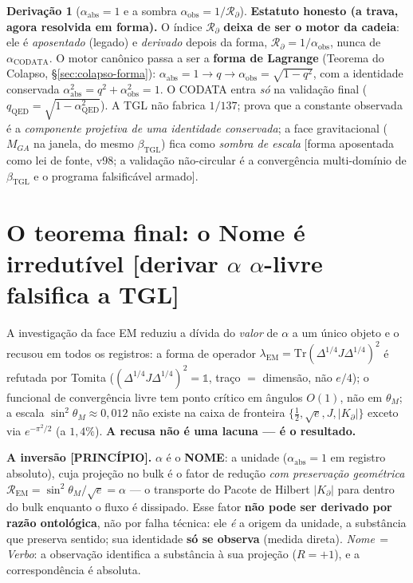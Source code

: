 \documentclass[11pt]{article}
\newcommand{\bTGL}{\beta_{\mathrm{TGL}}}\newcommand{\Msun}{M_{\odot}}\newcommand{\TGL}{\mathrm{TGL}}
\theoremstyle{definition}\newtheorem{deriv}{Derivação}
\begin{document}
\begin{deriv}[$\alpha_{\mathrm{abs}}=1$ e a sombra $\alpha_{\mathrm{obs}}=1/\mathcal{R}_\partial$]
\textbf{Estatuto honesto (a trava, agora resolvida em forma).} O índice $\mathcal{R}_\partial$ \textbf{deixa de ser o motor da cadeia}: ele é \emph{aposentado} (legado) e \emph{derivado} depois da forma, $\mathcal{R}_\partial=1/\alpha_{\mathrm{obs}}$, nunca de $\alpha_{\mathrm{CODATA}}$. O motor canônico passa a ser a \textbf{forma de Lagrange} (Teorema do Colapso, \S\ref{sec:colapso-forma}): $\alpha_{\mathrm{abs}}=1\to q\to\alpha_{\mathrm{obs}}=\sqrt{1-q^2}$, com a identidade conservada $\alpha_{\mathrm{abs}}^2=q^2+\alpha_{\mathrm{obs}}^2=1$. O CODATA entra \emph{só} na validação final ($q_{\mathrm{QED}}=\sqrt{1-\alpha_{\mathrm{QED}}^2}$). A TGL não fabrica $1/137$; prova que a constante observada é a \emph{componente projetiva de uma identidade conservada}; a face gravitacional ($M_{GA}$ na janela, do mesmo $\bTGL$) fica como \emph{sombra de escala} [forma aposentada como lei de fonte, v98; a validação não-circular é a convergência multi-domínio de $\bTGL$ e o programa falsificável armado].\end{deriv}

\section{O teorema final: o Nome é irredutível \textsf{[derivar $\alpha$ $\alpha$-livre falsifica a TGL]}}\label{sec:nome-irredutivel}

A investigação da face EM reduziu a dívida do \emph{valor} de $\alpha$ a um único objeto e o recusou em todos os registros: a forma de operador $\lambda_{\mathrm{EM}}=\mathrm{Tr}(\Delta^{1/4}J\Delta^{1/4})^2$ é refutada por Tomita ($(\Delta^{1/4}J\Delta^{1/4})^2=\mathbb{1}$, traço $=$ dimensão, não $e/4$); o funcional de convergência livre tem ponto crítico em ângulos $O(1)$, não em $\theta_M$; a escala $\sin^2\theta_M\approx0{,}012$ não existe na caixa de fronteira $\{\tfrac12,\sqrt e, J, |K_\partial|\}$ exceto via $e^{-\pi^2/2}$ (a $1{,}4\%$). \textbf{A recusa não é uma lacuna --- é o resultado.}

\textbf{A inversão \textsf{[PRINCÍPIO]}.} $\alpha$ é o \textbf{NOME}: a unidade ($\alpha_{\mathrm{abs}}=1$ em registro absoluto), cuja projeção no bulk é o fator de redução \emph{com preservação geométrica} $\mathcal{R}_{\mathrm{EM}}=\sin^2\theta_M/\sqrt e=\alpha$ --- o transporte do Pacote de Hilbert $|K_\partial|$ para dentro do bulk enquanto o fluxo é dissipado. Esse fator \textbf{não pode ser derivado por razão ontológica}, não por falha técnica: ele \emph{é} a origem da unidade, a substância que preserva sentido; sua identidade \textbf{só se observa} (medida direta). \emph{Nome$\,=\,$Verbo}: a observação identifica a substância à sua projeção ($R=+1$), e a correspondência é absoluta.
\end{document}

